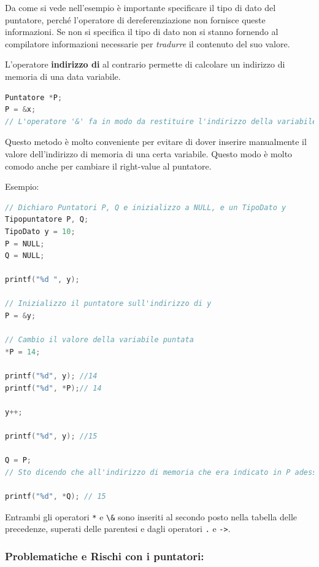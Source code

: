 \documentclass[
  paper=a4,
  oneside  ,captions=tableheading
]{scrbook}
\newcommand{\passthrough}[1]{#1}
\begin{document}
Da come si vede nell'esempio è importante specificare il tipo di dato
del puntatore, perché l'operatore di dereferenziazione non fornisce
queste informazioni. Se non si specifica il tipo di dato non si stanno
fornendo al compilatore informazioni necessarie per \emph{tradurre} il
contenuto del suo valore.

L'operatore \textbf{indirizzo di} al contrario permette di calcolare un
indirizzo di memoria di una data variabile.

\begin{lstlisting}[language=C]
Puntatore *P;
P = &x;
// L'operatore '&' fa in modo da restituire l'indirizzo della variabile x, che poi viene assegnato al puntatore P
\end{lstlisting}

Questo metodo è molto conveniente per evitare di dover inserire
manualmente il valore dell'indirizzo di memoria di una certa variabile.
Questo modo è molto comodo anche per cambiare il right-value al
puntatore.

Esempio:

\begin{lstlisting}[language=C]
// Dichiaro Puntatori P, Q e inizializzo a NULL, e un TipoDato y
Tipopuntatore P, Q;
TipoDato y = 10;
P = NULL;
Q = NULL;

printf("%d ", y);

// Inizializzo il puntatore sull'indirizzo di y
P = &y; 

// Cambio il valore della variabile puntata
*P = 14;

printf("%d", y); //14
printf("%d", *P);// 14

y++;

printf("%d", y); //15

Q = P; 
// Sto dicendo che all'indirizzo di memoria che era indicato in P adesso punta anche Q. Adesso ci sono 3 modi per accedere/modificare quella variabile.

printf("%d", *Q); // 15
\end{lstlisting}

Entrambi gli operatori \passthrough{\lstinline!*!} e
\passthrough{\lstinline!\&!} sono inseriti al secondo posto nella
tabella delle precedenze, superati delle parentesi e dagli operatori
\passthrough{\lstinline!.!} e \passthrough{\lstinline!->!}.

\hypertarget{problematiche-e-rischi-con-i-puntatori}{%
\subsubsection{Problematiche e Rischi con i
puntatori:}\label{problematiche-e-rischi-con-i-puntatori}}
\end{document}

